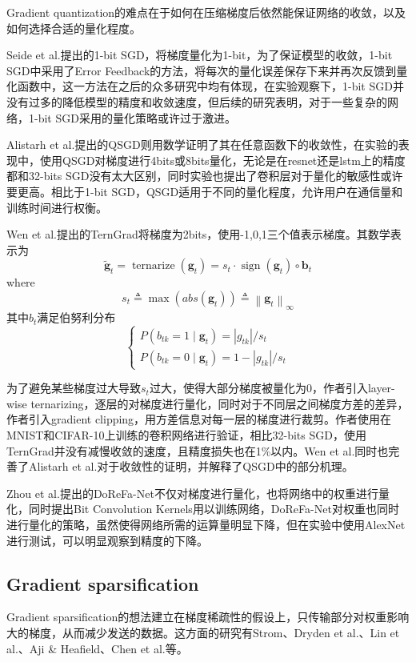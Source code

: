\documentclass[12pt,onecolumn,letterpaper]{article}
\begin{document}
    Gradient quantization的难点在于如何在压缩梯度后依然能保证网络的收敛，以及如何选择合适的量化程度。

    Seide et al.\cite{Seide2014}提出的1-bit SGD，将梯度量化为1-bit，为了保证模型的收敛，1-bit SGD中采用了Error Feedback的方法，将每次的量化误差保存下来并再次反馈到量化函数中，这一方法在之后的众多研究中均有体现，在实验观察下，1-bit SGD并没有过多的降低模型的精度和收敛速度，但后续的研究表明，对于一些复杂的网络，1-bit SGD采用的量化策略或许过于激进。
    
    Alistarh et al.\cite{Alistarh}提出的QSGD则用数学证明了其在任意函数下的收敛性，在实验的表现中，使用QSGD对梯度进行4bits或8bits量化，无论是在resnet还是lstm上的精度都和32-bits SGD没有太大区别，同时实验也提出了卷积层对于量化的敏感性或许要更高。相比于1-bit SGD，QSGD适用于不同的量化程度，允许用户在通信量和训练时间进行权衡。

    Wen et al.\cite{Wen}提出的TernGrad将梯度为2bits，使用-1,0,1三个值表示梯度。其数学表示为
    \[
        \tilde{\boldsymbol{g}}_{t}=\operatorname{ternarize}\left(\boldsymbol{g}_{t}\right)=s_{t} \cdot \operatorname{sign}\left(\boldsymbol{g}_{t}\right) \circ \boldsymbol{b}_{t}
    \]
    where
    \[
        s_{t} \triangleq \max \left(a b s\left(\boldsymbol{g}_{t}\right)\right) \triangleq\left\|\boldsymbol{g}_{t}\right\|_{\infty}
    \]
    其中$b_t$满足伯努利分布
    \[
        \left\{\begin{array}{l}
        P\left(b_{t k}=1 \mid \boldsymbol{g}_{t}\right)=\left|g_{t k}\right| / s_{t} \\
        P\left(b_{t k}=0 \mid \boldsymbol{g}_{t}\right)=1-\left|g_{t k}\right| / s_{t}
        \end{array}\right.
    \]

    为了避免某些梯度过大导致$s_{t}$过大，使得大部分梯度被量化为0，作者引入layer-wise ternarizing，逐层的对梯度进行量化，同时对于不同层之间梯度方差的差异，作者引入gradient clipping，用方差信息对每一层的梯度进行裁剪。作者使用在MNIST和CIFAR-10上训练的卷积网络进行验证，相比32-bits SGD，使用TernGrad并没有减慢收敛的速度，且精度损失也在1\%以内。Wen et al.\cite{Wen}同时也完善了Alistarh et al.\cite{Alistarh}对于收敛性的证明，并解释了QSGD中的部分机理。

    Zhou et al.\cite{Zhou}提出的DoReFa-Net不仅对梯度进行量化，也将网络中的权重进行量化，同时提出Bit Convolution Kernels用以训练网络，DoReFa-Net对权重也同时进行量化的策略，虽然使得网络所需的运算量明显下降，但在实验中使用AlexNet进行测试，可以明显观察到精度的下降。


    \subsection{Gradient sparsification}
    Gradient sparsification的想法建立在梯度稀疏性的假设上，只传输部分对权重影响大的梯度，从而减少发送的数据。这方面的研究有Strom\cite{International}、Dryden et al.\cite{Dryden2016}、Lin et al.\cite{Lin2017}、Aji \& Heafield\cite{Aji2017}、Chen et al.\cite{Chen}等。
\end{document}
